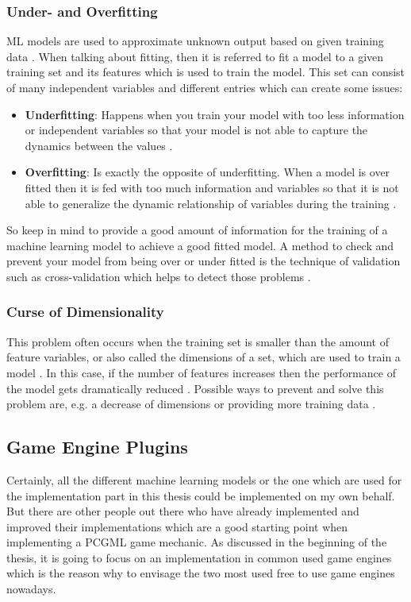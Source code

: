 \documentclass[MGS,Master,english]{twbook}%
\begin{document}
\subsubsection{Under- and Overfitting}
ML models are used to approximate unknown output based on given training data \cite{ml::book::algorithms}. When talking about fitting, then it is referred to fit a model to a given training set and its features which is used to train the model. This set can consist of many independent variables and different entries which can create some issues:
\begin{itemize}
	\item \textbf{Underfitting}: Happens when you train your model with too less information or independent variables so that your model is not able to capture the dynamics between the values \cite{ml::book::algorithms}.
	\item \textbf{Overfitting}: Is exactly the opposite of underfitting. When a model is over fitted then it is fed with too much information and variables so that it is not able to generalize the dynamic relationship of variables during the training \cite{ml::book::algorithms}.
\end{itemize}
So keep in mind to provide a good amount of information for the training of a machine learning model to achieve a good fitted model. A method to check and prevent your model from being over or under fitted is the technique of validation such as cross-validation which helps to detect those problems \cite{ml::book::algorithms}.

\subsubsection{Curse of Dimensionality}
This problem often occurs when the training set is smaller than the amount of feature variables, or also called the dimensions of a set, which are used to train a model \cite{ml::book::algorithms}. In this case, if the number of features increases then the performance of the model gets dramatically reduced \cite{ml::book::algorithms}. Possible ways to prevent and solve this problem are, e.g. a decrease of dimensions or providing more training data \cite{ml::book::algorithms}.

\subsection{Game Engine Plugins}
Certainly, all the different machine learning models or the one which are used for the implementation part in this thesis could be implemented on my own behalf. But there are other people out there who have already implemented and improved their implementations which are a good starting point when implementing a PCGML game mechanic. As discussed in the beginning of the thesis, it is going to focus on an implementation in common used game engines which is the reason why to envisage the two most used free to use game engines nowadays.
\end{document}
